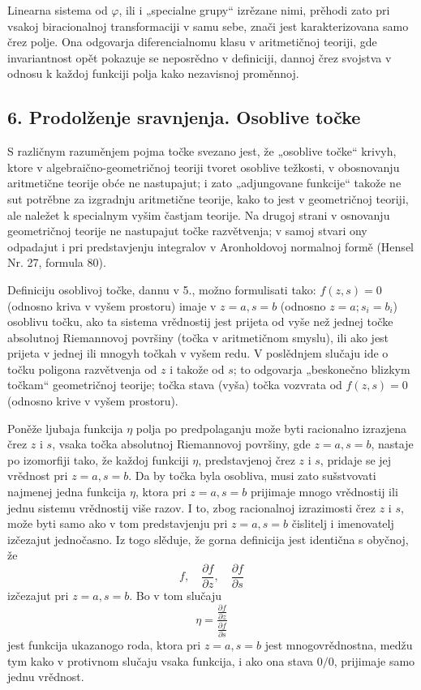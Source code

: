 \documentclass[11pt]{article}
\providecommand{\p}{\partial}
\begin{document}
Linearna sistema od \(\varphi\), ili i „specialne grupy“ izrězane nimi, prěhodi zato pri vsakoj biracionalnoj transformaciji v samu sebe, znači jest karakterizovana samo črez polje. Ona odgovarja diferencialnomu klasu v aritmetičnoj teoriji, gde invariantnost opět pokazuje se neposrědno v definiciji, dannoj črez svojstva v odnosu k každoj funkciji polja kako nezavisnoj proměnnoj.

\subsection*{6. Prodolženje sravnjenja. Osoblive točke}
S različnym razuměnjem pojma točke svezano jest, že „osoblive točke“ krivyh, ktore v algebraično-geometričnoj teoriji tvoret osoblive težkosti, v obosnovanju aritmetične teorije obće ne nastupajut; i zato „adjungovane funkcije“ takože ne sut potrěbne za izgradnju aritmetične teorije, kako to jest v geometričnoj teoriji, ale naležet k specialnym vyšim častjam teorije. Na drugoj strani v osnovanju geometričnoj teorije ne nastupajut točke razvětvenja; v samoj stvari ony odpadajut i pri predstavjenju integralov v Aronholdovoj normalnoj formě (Hensel Nr. 27, formula 80).

Definiciju osoblivoj točke, dannu v 5., možno formulisati tako: \(f(z,s)=0\) (odnosno kriva v vyšem prostoru) imaje v \(z=a,s=b\) (odnosno \(z=a; s_i=b_i\)) osoblivu točku, ako ta sistema vrědnostij jest prijeta od vyše než jednej točke absolutnoj Riemannovoj površiny (točka v aritmetičnom smyslu), ili ako jest prijeta v jednej ili mnogyh točkah v vyšem redu. V poslědnjem slučaju ide o točku poligona razvětvenja od \(z\) i takože od \(s\); to odgovarja „beskonečno blizkym točkam“ geometričnoj teorije; točka stava (vyša) točka vozvrata od \(f(z,s)=0\) (odnosno krive v vyšem prostoru).

Poněže ljubaja funkcija \(\eta\) polja po predpolaganju može byti racionalno izrazjena črez \(z\) i \(s\), vsaka točka absolutnoj Riemannovoj površiny, gde \(z=a,s=b\), nastaje po izomorfiji tako, že každoj funkciji \(\eta\), predstavjenoj črez \(z\) i \(s\), pridaje se jej vrědnost pri \(z=a,s=b\). Da by točka byla osobliva, musi zato sušstvovati najmenej jedna funkcija \(\eta\), ktora pri \(z=a,s=b\) prijimaje mnogo vrědnostij ili jednu sistemu vrědnostij više razov. I to, zbog racionalnoj izrazimosti črez \(z\) i \(s\), može byti samo ako v tom predstavjenju pri \(z=a,s=b\) čislitelj i imenovatelj izčezajut jednočasno. Iz togo slěduje, že gorna definicija jest identična s obyčnoj, že
\[
f,\quad \frac{\p f}{\p z},\quad \frac{\p f}{\p s}
\]
izčezajut pri \(z=a,s=b\). Bo v tom slučaju
\[
\eta=\frac{\frac{\p f}{\p z}}{\frac{\p f}{\p s}}
\]
jest funkcija ukazanogo roda, ktora pri \(z=a,s=b\) jest mnogovrědnostna, medžu tym kako v protivnom slučaju vsaka funkcija, i ako ona stava \(0/0\), prijimaje samo jednu vrědnost.
\end{document}
